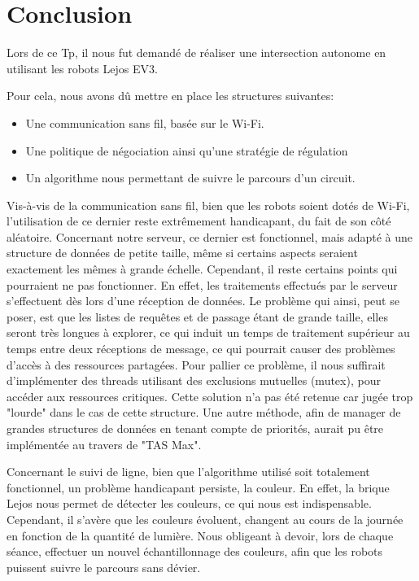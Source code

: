 \documentclass[french,a4paper,12pt]{report}
\begin{document}
\chapter{Conclusion}
Lors de ce Tp, il nous fut demandé de réaliser une intersection autonome en utilisant les robots Lejos EV3.

Pour cela, nous avons dû mettre en place les structures suivantes:
\begin{itemize}
\item Une communication sans fil, basée sur le Wi-Fi.

\item Une politique de négociation ainsi qu'une stratégie de régulation

\item Un algorithme nous permettant de suivre le parcours d'un circuit.
\end{itemize}

Vis-à-vis de la communication sans fil, bien que les robots soient dotés de Wi-Fi, l'utilisation de ce dernier reste extrêmement handicapant, du fait de son côté aléatoire.
Concernant notre serveur, ce dernier est fonctionnel, mais adapté à une structure de données de petite taille, même si certains aspects seraient exactement les mêmes à grande échelle. Cependant, il reste certains points qui pourraient ne pas fonctionner. 
En effet, les traitements effectués par le serveur s'effectuent dès lors d'une réception de données. Le problème qui ainsi, peut se poser, est que les listes de requêtes et de passage étant de grande taille, elles seront très longues à explorer, ce qui induit un temps de traitement supérieur au temps entre deux réceptions de message, ce qui pourrait causer des problèmes d'accès à des ressources partagées.
Pour pallier ce problème, il nous suffirait d’implémenter des threads utilisant des exclusions mutuelles (mutex), pour accéder aux ressources critiques. Cette solution n’a pas été retenue car jugée trop "lourde" dans le cas de cette structure.
Une autre méthode, afin de manager de grandes structures de données en tenant compte de priorités, aurait pu être implémentée au travers de "TAS Max".

Concernant le suivi de ligne, bien que l'algorithme utilisé soit totalement fonctionnel, un problème handicapant persiste, la couleur. En effet, la brique Lejos nous permet de détecter les couleurs, ce qui nous est indispensable. Cependant, il s'avère que les couleurs évoluent, changent au cours de la journée en fonction de la quantité de lumière. Nous obligeant à devoir, lors de chaque séance, effectuer un nouvel échantillonnage des couleurs, afin que les robots puissent suivre le parcours sans dévier.
\end{document}
